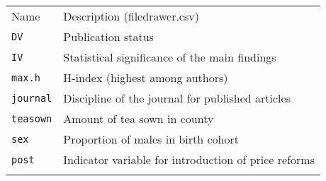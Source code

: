 \documentclass[]{article}
\begin{document}
\begin{longtable}[c]{@{}ll@{}}
\toprule\addlinespace
\begin{minipage}[b]{0.24\columnwidth}\raggedright
Name
\end{minipage} & \begin{minipage}[b]{0.69\columnwidth}\raggedright
Description (filedrawer.csv)
\end{minipage}
\\\addlinespace
\midrule\endhead
\begin{minipage}[t]{0.24\columnwidth}\raggedright
\texttt{DV}
\end{minipage} & \begin{minipage}[t]{0.69\columnwidth}\raggedright
Publication status
\end{minipage}
\\\addlinespace
\begin{minipage}[t]{0.24\columnwidth}\raggedright
\texttt{IV}
\end{minipage} & \begin{minipage}[t]{0.69\columnwidth}\raggedright
Statistical significance of the main findings
\end{minipage}
\\\addlinespace
\begin{minipage}[t]{0.24\columnwidth}\raggedright
\texttt{max.h}
\end{minipage} & \begin{minipage}[t]{0.69\columnwidth}\raggedright
H-index (highest among authors)
\end{minipage}
\\\addlinespace
\begin{minipage}[t]{0.24\columnwidth}\raggedright
\texttt{journal}
\end{minipage} & \begin{minipage}[t]{0.69\columnwidth}\raggedright
Discipline of the journal for published articles
\end{minipage}
\\\addlinespace
\begin{minipage}[t]{0.24\columnwidth}\raggedright
\texttt{teasown}
\end{minipage} & \begin{minipage}[t]{0.69\columnwidth}\raggedright
Amount of tea sown in county
\end{minipage}
\\\addlinespace
\begin{minipage}[t]{0.24\columnwidth}\raggedright
\texttt{sex}
\end{minipage} & \begin{minipage}[t]{0.69\columnwidth}\raggedright
Proportion of males in birth cohort
\end{minipage}
\\\addlinespace
\begin{minipage}[t]{0.24\columnwidth}\raggedright
\texttt{post}
\end{minipage} & \begin{minipage}[t]{0.69\columnwidth}\raggedright
Indicator variable for introduction of price reforms
\end{minipage}
\\\addlinespace
\bottomrule
\end{longtable}
\end{document}
